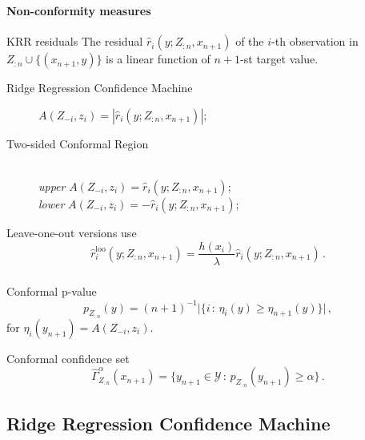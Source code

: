 \documentclass[t]{beamer}  %
\newcommand{\Ycal}{\mathcal{Y}}
\begin{document}
\begin{frame}[t]\frametitle{\insertsection}
  \framesubtitle{Non-conformity measures}
  \begin{block}{KRR residuals}  
    The residual $\hat{r}_i(y; Z_{:n}, x_{n+1})$ of the $i$-th observation in
    $Z_{:n}\cup\{(x_{n+1}, y)\}$ is a linear function of $n+1$-st target value.
  \end{block}

  \begin{description}
    \item[Ridge Regression Confidence Machine] $A(Z_{-i}, z_i) = |\hat{r}_i(y; Z_{:n}, x_{n+1})|$;
    \vspace{\baselineskip}
    \item[Two-sided Conformal Region] \hfill\\
      \textit{upper} $A(Z_{-i}, z_i) = \hat{r}_i(y; Z_{:n}, x_{n+1})$;\hfill\\
      \textit{lower} $A(Z_{-i}, z_i) = -\hat{r}_i(y; Z_{:n}, x_{n+1})$;
  \end{description}

  \begin{block}{Leave-one-out versions use}
    $$ \hat{r}^{\text{loo}}_i(y; Z_{:n}, x_{n+1})
      = \frac{h(x_i)}{\lambda} \hat{r}_i(y; Z_{:n}, x_{n+1}) \,. $$
  \end{block}
\end{frame}

\begin{frame}[c]\frametitle{\insertsection}
  \begin{block}{Conformal p-value}
    $$ p_{Z_{:n}}(y)
          = (n+1)^{-1} \bigl\lvert\{ i \,:\, \eta_i(y) \geq \eta_{n+1}(y) \}\bigr\rvert
      \,, $$
    for $\eta_i(y_{n+1}) = A(Z_{-i}, z_i)$.
  \end{block}
  \vspace{\baselineskip}
  \vspace{\baselineskip}
  \begin{block}{Conformal confidence set}
    $$ \hat{\Gamma}_{Z_{:n}}^\alpha(x_{n+1})
        = \bigl\{ y_{n+1}\in \Ycal \,:\, p_{Z_{:n}}(y_{n+1}) \geq \alpha \bigr\}
      \,. $$
  \end{block}
\end{frame}

\subsection{Ridge Regression Confidence Machine} %
\label{sub:ridge_regression_confidence_machine}
\end{document}
